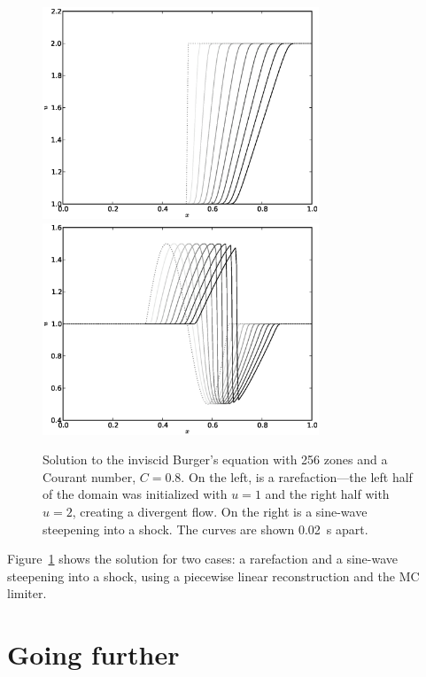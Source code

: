 \documentclass[11pt]{article}
\begin{document}
\begin{figure}[t]
\centering
\includegraphics[width=3.25in]{fv-burger-rarefaction}
\includegraphics[width=3.25in]{fv-burger-sine}
\caption{\label{fig:burgers} Solution to the inviscid Burger's equation
with 256 zones and a Courant number, $C = 0.8$.  On the left, is a
rarefaction---the left half of the domain was initialized with $u = 1$ 
and the right half with $u = 2$, creating a divergent flow.  On the
right is a sine-wave steepening into a shock.  The curves are shown 0.02~s
apart.}
\end{figure}

Figure~\ref{fig:burgers} shows the solution for two cases: a rarefaction
and a sine-wave steepening into a shock, using a piecewise linear
reconstruction and the MC limiter.


\section{Going further}
\end{document}
